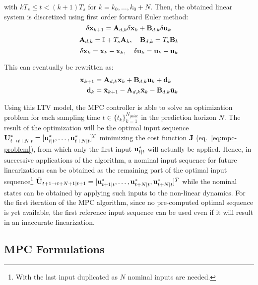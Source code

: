 \documentclass[../main.tex]{subfiles}
\begin{document}
with $k T_s \leq t < (k + 1) T_s$ for $k = k_0, \ldots, k_0 + N$. Then, the obtained
linear system is discretized using first order forward Euler method:
\begin{equation*}
	\delta \mathbf{x}_{k+1} = \mathbf{A}_{d,k} \delta \mathbf{x}_k + \mathbf{B}_{d,k} \delta
	\mathbf{u}_k
\end{equation*}
\begin{equation}\label{eq:discretization}
	\mathbf{A}_{d,k} = \mathbb{I} + T_s \mathbf{A}_k, \quad \mathbf{B}_{d,k} = T_s
	\mathbf{B}_k
\end{equation}
\begin{equation*}
	\delta \mathbf{x}_k = \mathbf{x}_k - \bar{\mathbf{x}}_k, \quad
	\delta \mathbf{u}_k = \mathbf{u}_k - \bar{\mathbf{u}}_k
\end{equation*}

This can eventually be rewritten as:
\begin{equation}
	\begin{aligned}
		\mathbf{x}_{k+1} &= \mathbf{A}_{d,k} \mathbf{x}_k + \mathbf{B}_{d,k} \mathbf{u}_k +
		\mathbf{d}_k\\
		\mathbf{d}_k &= \bar{\mathbf{x}}_{k+1} - \mathbf{A}_{d,k} \bar{\mathbf{x}}_k -
		\mathbf{B}_{d,k} \bar{\mathbf{u}}_k
	\end{aligned}
\end{equation}

Using this LTV model, the MPC controller is able to solve an optimization
problem for each sampling time $t \in \{t_k\}_{k=1}^{N_{guide}}$ in the prediction horizon $N$. The
result of the optimization will be the optimal input sequence $\mathbf{U}^*_{t \to
t+N | t} = [ \mathbf{u}^*_{t | t}, \ldots, \mathbf{u}^*_{t+N | t} ]^T$ 
minimizing the cost function $\mathbf{J}$ (eq.~\ref{eq:mpc-problem}), from which only the first input $\mathbf{u}^*_{t
	| t}$ will
actually be applied. Hence, in successive applications of the algorithm, a
nominal input sequence for future linearizations can be obtained as the
remaining part of the optimal input sequence\footnote{With the last input
duplicated as $N$ nominal inputs are needed.}
$\bar{\mathbf{U}}_{t+1 \to t+N+1 | t+1} = [ \mathbf{u}^*_{t+1 | t}, \ldots,
\mathbf{u}^*_{t+N | t}, \mathbf{u}^*_{t+N | t} ]^T$ while the nominal states can be
obtained by applying such inputs to the non-linear dynamics. For the
first iteration of the MPC algorithm, since no pre-computed optimal sequence is yet
available, the first reference input sequence can be used
even if it will result in an inaccurate linearization.

\subsection{MPC Formulations}
\end{document}
